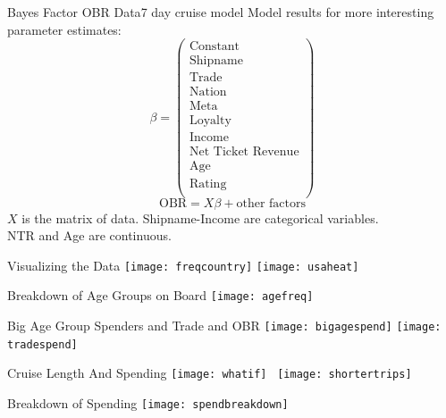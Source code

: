 \documentclass[table]{beamer}
\begin{document}
\begin{frame}{Bayes Factor OBR Data}{7 day cruise model}
	Model results for more interesting parameter estimates:\\
	$$\beta = \begin{pmatrix}
		\text{Constant} \\ \text{Shipname} \\ \text{Trade} \\ \text{Nation} \\
		\text{Meta} \\ \text{Loyalty} \\ \text{Income} \\ \text{Net Ticket Revenue} \\ \text{Age} \\
		\text{Rating} \\
	\end{pmatrix} $$
	\[ \text{OBR} = X\beta  + \text{other factors} \] $ X $ is the matrix of data. Shipname-Income are categorical variables.\\ 
	 NTR and Age are continuous.   
\end{frame}

\begin{frame}{Visualizing the Data}
	\texttt{[image: freqcountry]}	\texttt{[image: usaheat]} 	
\end{frame}

\begin{frame}{Breakdown of Age Groups on Board}
	\texttt{[image: agefreq]}
\end{frame}

\begin{frame}{Big Age Group Spenders and Trade and OBR}
	\texttt{[image: bigagespend]}
		\texttt{[image: tradespend]}
\end{frame}

\begin{frame}{Cruise Length And Spending}
	\texttt{[image: whatif]} \ \texttt{[image: shortertrips]}
\end{frame}

\begin{frame}{Breakdown of Spending}
	\centering
	\texttt{[image: spendbreakdown]}
\end{frame}
\end{document}
